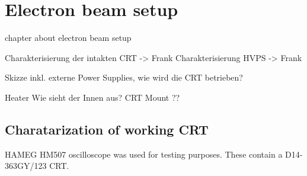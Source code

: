 \chapter{Electron beam setup}\label{ch:Electron beam setup}

chapter about electron beam setup

Charakterisierung der intakten CRT -> Frank 
Charakterisierung HVPS ->  Frank 

Skizze inkl. externe Power Supplies, wie wird die CRT betrieben?

Heater
Wie sieht der Innen aus? 
CRT Mount ??

\section{Charatarization of working CRT}\label{sec:Charatarization of working CRT}

HAMEG HM507 oscilloscope was used for testing purposes. These contain a D14-363GY/123 CRT.
